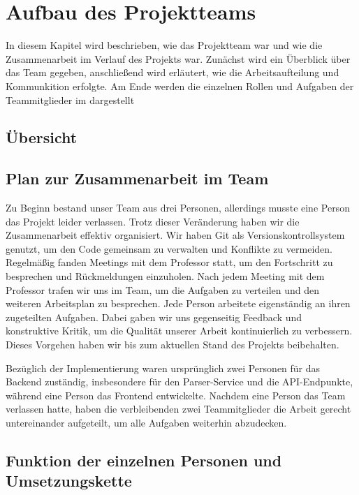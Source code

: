 \chapter{Aufbau des Projektteams}
In diesem Kapitel wird beschrieben, wie das Projektteam war und wie die 
Zusammenarbeit im Verlauf des Projekts war. Zunächst wird ein Überblick über
das Team gegeben, anschließend wird erläutert, wie die Arbeitsaufteilung
und Kommunkition erfolgte. Am Ende werden die einzelnen Rollen und Aufgaben
der Teammitglieder im dargestellt

\section{Übersicht}

\section{Plan zur Zusammenarbeit im Team}


Zu Beginn bestand unser Team aus drei Personen, allerdings musste eine Person das Projekt leider verlassen.
Trotz dieser Veränderung haben wir die Zusammenarbeit effektiv organisiert.
Wir haben Git als Versionskontrollsystem genutzt, um den Code gemeinsam zu verwalten und Konflikte zu vermeiden.
Regelmäßig fanden Meetings mit dem Professor  statt, um den Fortschritt zu besprechen
und Rückmeldungen einzuholen. Nach jedem Meeting mit dem Professor trafen wir uns im Team, um die Aufgaben zu verteilen
und den weiteren Arbeitsplan zu besprechen.
Jede Person arbeitete eigenständig an ihren zugeteilten Aufgaben.
Dabei gaben wir uns gegenseitig Feedback und konstruktive Kritik,
um die Qualität unserer Arbeit kontinuierlich zu verbessern. 
Dieses Vorgehen haben wir bis zum aktuellen Stand des Projekts beibehalten.

Bezüglich der Implementierung waren ursprünglich zwei Personen für das Backend zuständig,
insbesondere für den Parser-Service und die API-Endpunkte, während eine Person
das Frontend entwickelte. Nachdem eine Person das Team verlassen hatte,
haben die verbleibenden zwei Teammitglieder die Arbeit gerecht untereinander aufgeteilt, um alle Aufgaben weiterhin abzudecken.



\section{Funktion der einzelnen Personen und Umsetzungskette}